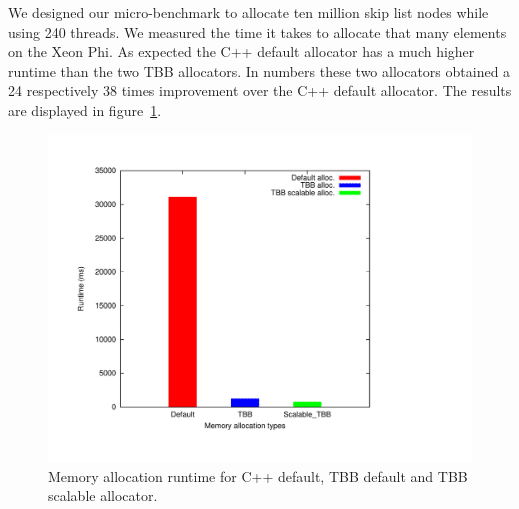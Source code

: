 We designed our micro-benchmark to allocate ten million skip list nodes while using 240 threads. We measured the time it takes to allocate that many elements on the Xeon Phi. As expected the C++ default allocator has a much higher runtime than the two TBB allocators. In numbers these two allocators obtained a 24 respectively 38 times improvement over the C++ default allocator. The results are displayed in figure~\ref{fig:mem_alloc}.

\begin{figure}
	\centering
  	\includegraphics[scale=0.3]{../plots/mem_alloc/mem_alloc.pdf}
	\caption{Memory allocation runtime for C++ default, TBB default and TBB scalable allocator.}
	\label{fig:mem_alloc}
\end{figure}
